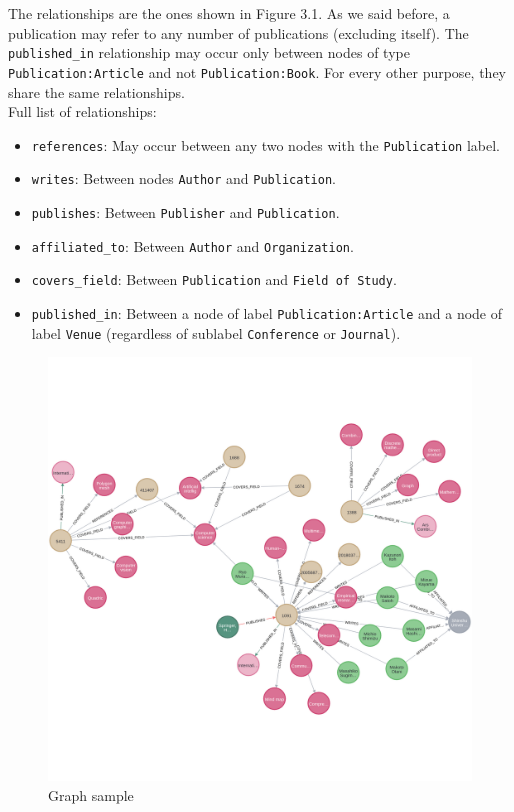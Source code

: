 \documentclass{Configuration_Files/PoliMi3i_thesis}
\begin{document}
The relationships are the ones shown in Figure 3.1. As we said before, a publication may refer to any number of publications (excluding itself). The \texttt{published\_in} relationship may occur only between nodes of type \texttt{Publication:Article} and not \texttt{Publication:Book}. For every other purpose, they share the same relationships. \\
Full list of relationships:
\begin{itemize}
    \item \texttt{references}: May occur between any two nodes with the \texttt{Publication} label.
    \item \texttt{writes}: Between nodes \texttt{Author} and \texttt{Publication}.
    \item \texttt{publishes}: Between \texttt{Publisher} and \texttt{Publication}.
    \item \texttt{affiliated\_to}: Between \texttt{Author} and \texttt{Organization}.
    \item \texttt{covers\_field}: Between \texttt{Publication} and \texttt{Field of Study}.
    \item \texttt{published\_in}: Between a node of label \texttt{Publication:Article} and a node of label \texttt{Venue} (regardless of sublabel \texttt{Conference} or \texttt{Journal}). 
\end{itemize}
\begin{figure}[H]
    \centering
    \includegraphics[width=1\textwidth]{Images/graph.png}
    \caption{Graph sample}
    \label{fig:quadtree}
\end{figure}
\end{document}
